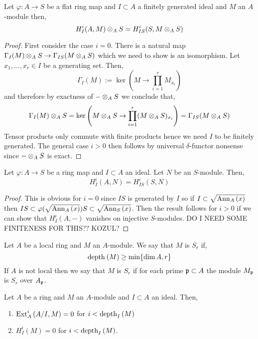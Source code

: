 \documentclass[12pt]{article}
\begin{document}
\begin{lemma}
Let $\varphi : A \to S$ be a flat ring map and $I \subset A$ a finitely generated ideal and $M$ an $A$-module then,
\[ H^i_I(A, M) \otimes_A S = H^i_{IS}(S, M \otimes_A S) \]
\end{lemma}

\begin{proof}
First consider the case $i = 0$. There is a natural map $\Gamma_I(M) \otimes_A S \to \Gamma_{IS}(M \otimes_A S)$ which we need to show is an isomorphism. Let $x_1, \dots, x_r \in I$ be a generating set. Then, 
\[ \Gamma_I(M) := \ker{ \left( M \to \prod_{i = 1}^r M_{x_i} \right)} \]
and therefore by exactness of $- \otimes_A S$ we conclude that,
\[ \Gamma_I(M) \otimes_A S = \ker{ \left( M \otimes_A S \to \prod_{i = 1}^r (M \otimes_A S)_{x_i} \right)} = \Gamma_{IS}(M \otimes_A S) \]
Tensor products only commute with finite products hence we need $I$ to be finitely generated. The general case $i > 0$ then follows by universal $\delta$-functor nonsense since $- \otimes_A S$ is exact.
\end{proof}

\begin{lemma}
Let $\varphi : A \to S$ be a ring map and $I \subset A$ an ideal. Let $N$ be an $S$-module. Then,
\[ H^i_I(A, N) = H^i_{IS}(S, N) \]
\end{lemma}

\begin{proof}
This is obvious for $i = 0$ since $IS$ is generated by $I$ so if $I \subset \sqrt{\mathrm{Ann}_{A}\left(x\right)}$ then $IS \subset \varphi(\sqrt{\mathrm{Ann}_{A}\left(x\right)}) S \subset \sqrt{\mathrm{Ann}_{S}\left(x\right)}$. Then the result follows for $i > 0$ if we can show that $H^i_I(A, -)$ vanishes on injective $S$-modules. {\color{red} DO I NEED SOME FINITENESS FOR THIS?? KOZUL?}
\end{proof}


\begin{defn}
Let $A$ be a local ring and $M$ an $A$-module. We say that $M$ is $S_r$ if,
\[ \mathrm{depth}_{} \left( M \right) \ge \min \{ \dim{A}, r \} \]
If $A$ is not local then we say that $M$ is $S_r$ if for each prime $\mathfrak{p} \subset A$ the module $M_{\mathfrak{p}}$ is $S_r$ over $A_{\mathfrak{p}}$.
\end{defn}


\begin{prop}
Let $A$ be a ring and $M$ an $A$-module and $I \subset A$ an ideal. Then,
\begin{enumerate}
\item $\mathrm{Ext}^{i}_{A} \left( A/I, M \right) = 0$ for $i < \mathrm{depth}_{I} \left( M \right)$
\item $H^i_I(M) = 0$ for $i < \mathrm{depth}_{I} \left( M \right)$.
\end{enumerate}
\end{prop}
\end{document}

